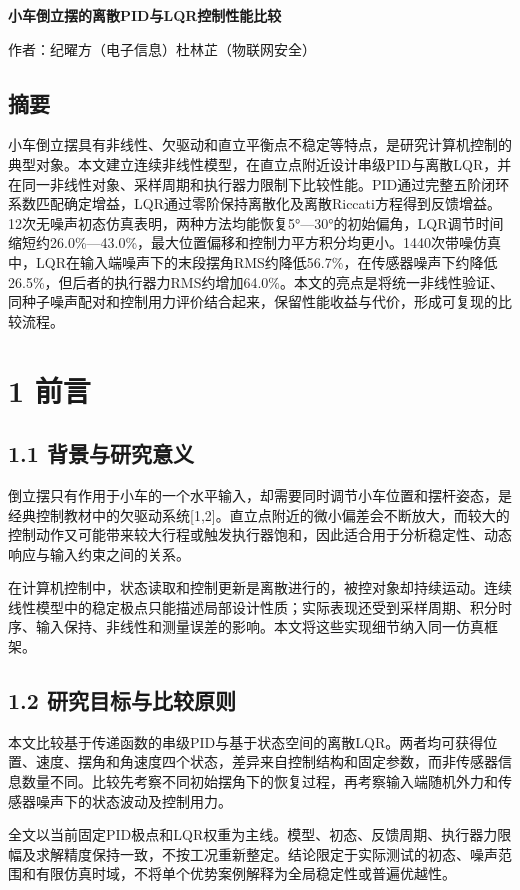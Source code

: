 \documentclass[UTF8,a4paper,fontset=fandol,zihao=5]{ctexart}
\begin{document}
\linespread{1}
\fontsize{10.5}{14}\selectfont

\begin{center}{\fontsize{17}{23}\selectfont\bfseries 小车倒立摆的离散PID与LQR控制性能比较}\end{center}
\begin{center}{\fontsize{9.5}{12}\selectfont 作者：纪曜方（电子信息）\qquad 杜林芷（物联网安全）}\end{center}
\subsection*{摘要}
小车倒立摆具有非线性、欠驱动和直立平衡点不稳定等特点，是研究计算机控制的典型对象。本文建立连续非线性模型，在直立点附近设计串级PID与离散LQR，并在同一非线性对象、采样周期和执行器力限制下比较性能。PID通过完整五阶闭环系数匹配确定增益，LQR通过零阶保持离散化及离散Riccati方程得到反馈增益。12次无噪声初态仿真表明，两种方法均能恢复5°—30°的初始偏角，LQR调节时间缩短约26.0\%—43.0\%，最大位置偏移和控制力平方积分均更小。1440次带噪仿真中，LQR在输入端噪声下的末段摆角RMS约降低56.7\%，在传感器噪声下约降低26.5\%，但后者的执行器力RMS约增加64.0\%。本文的亮点是将统一非线性验证、同种子噪声配对和控制用力评价结合起来，保留性能收益与代价，形成可复现的比较流程。\par
\par{}\par
\section*{1 前言}
\subsection*{1.1 背景与研究意义}
倒立摆只有作用于小车的一个水平输入，却需要同时调节小车位置和摆杆姿态，是经典控制教材中的欠驱动系统[1,2]。直立点附近的微小偏差会不断放大，而较大的控制动作又可能带来较大行程或触发执行器饱和，因此适合用于分析稳定性、动态响应与输入约束之间的关系。\par
在计算机控制中，状态读取和控制更新是离散进行的，被控对象却持续运动。连续线性模型中的稳定极点只能描述局部设计性质；实际表现还受到采样周期、积分时序、输入保持、非线性和测量误差的影响。本文将这些实现细节纳入同一仿真框架。\par
\subsection*{1.2 研究目标与比较原则}
本文比较基于传递函数的串级PID与基于状态空间的离散LQR。两者均可获得位置、速度、摆角和角速度四个状态，差异来自控制结构和固定参数，而非传感器信息数量不同。比较先考察不同初始摆角下的恢复过程，再考察输入端随机外力和传感器噪声下的状态波动及控制用力。\par
全文以当前固定PID极点和LQR权重为主线。模型、初态、反馈周期、执行器力限幅及求解精度保持一致，不按工况重新整定。结论限定于实际测试的初态、噪声范围和有限仿真时域，不将单个优势案例解释为全局稳定性或普遍优越性。\par
\newpage
\end{document}
